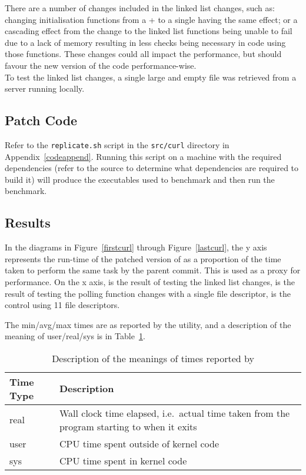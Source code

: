 There are a number of changes included in the linked list changes, such as: changing initialisation functions from a \malloc{}+ to a single  having the same effect; or a cascading effect from the change to the linked list functions being unable to fail due to a lack of memory resulting in less checks being necessary in code using those functions. These changes could all impact the performance, but should favour the new version of the code performance-wise.\\
To test the linked list changes, a single large and empty file was retrieved from a server running locally.

\subsection{Patch Code}

Refer to the \texttt{replicate.sh} script in the \texttt{src/curl} directory in Appendix~\ref{codeappend}. Running this script on a machine with the required dependencies (refer to the  source to determine what dependencies are required to build it) will produce the executables used to benchmark and then run the benchmark.

\subsection{Results}

In the diagrams in Figure~\ref{firstcurl} through Figure~\ref{lastcurl}, the y axis represents the run-time of the patched version of  as a proportion of the time taken to perform the same task by the parent commit. This is used as a proxy for performance. On the x axis,  is the result of testing the linked list changes,  is the result of testing the polling function changes with a single file descriptor,  is the control using 11 file descriptors.

The min/avg/max times are as reported by the  utility, and a description of the meaning of user/real/sys is in Table~\ref{timestable}.

\begin{table}
	\centering
	\begin{tabularx}{\linewidth}{>{\hsize=0.6\hsize}X >{\hsize=1.4\hsize}X}
		\toprule
		\textbf{Time Type} & \textbf{Description} \\
		\midrule
		real & Wall clock time elapsed, i.e.\ actual time taken from the program starting to when it exits \\
		user & CPU time spent outside of kernel code \\
		sys & CPU time spent in kernel code \\
		\bottomrule
	\end{tabularx}
	\caption{Description of the meanings of times reported by }\label{timestable}
\end{table}

